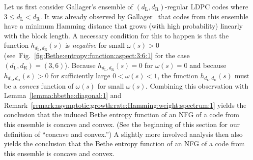\documentclass[journal, twocolumn]{IEEEtran}
\renewcommand{\leq}{\leqslant}
\newcommand{\dleft}{d_{\mathrm{L}}}
\newcommand{\dright}{d_{\mathrm{R}}}
\newcommand{\?}{\mathrm{?}}
\begin{document}
Let us first consider Gallager's ensemble of $(\dleft,\dright)$-regular LDPC
codes where $3 \leq \dleft < \dright$. It was already observed by
Gallager~\cite{Gallager:63} that codes from this ensemble have a minimum
Hamming distance that grows (with high probability) linearly with the block
length. A necessary condition for this to happen is that the function
$h_{\dleft,\dright}(s)$ is \emph{negative} for small $\omega(s) > 0$
(see~Fig.~\ref{fig:Bethe:entropy:function:aspect:3:6:1} for the case
$(\dleft,\dright) = (3,6)$). Because $h_{\dleft,\dright}(s) = 0$ for
$\omega(s) = 0$ and because $h_{\dleft,\dright}(s) > 0$ for sufficiently large
$0 < \omega(s) < 1$, the function $h_{\dleft,\dright}(s)$ must be a
\emph{convex} function of $\omega(s)$ for small $\omega(s)$. Combining this
observation with Lemma~\ref{lemma:hbethe:diagonal:1} and
Remark~\ref{remark:asymptotic:growth:rate:Hamming:weight:spectrum:1} yields
the conclusion that the induced Bethe entropy function of an NFG of a code
from this ensemble is concave and convex. (See the beginning of this section
for our definition of ``concave and convex.'') A slightly more involved
analysis then also yields the conclusion that the Bethe entropy function of an
NFG of a code from this ensemble is concave and convex.
\end{document}
